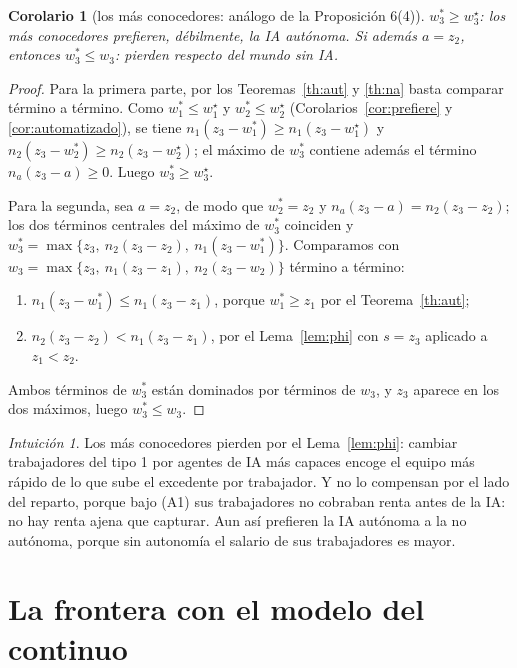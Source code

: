 \documentclass[11pt]{article}
\theoremstyle{plain}
\newtheorem{corolario}{Corolario}
\theoremstyle{definition}
\theoremstyle{remark}
\newtheorem*{intuicion}{Intuición}
\newcommand{\ai}{a}
\begin{document}
\begin{corolario}[los más conocedores: análogo de la Proposición 6(4)]\label{cor:top}
$w_3^{*}\ge w_3^{\star}$: los más conocedores prefieren, débilmente, la IA autónoma. Si además
$\ai=z_2$, entonces $w_3^{*}\le w_3$: pierden respecto del mundo sin IA.
\end{corolario}
\begin{proof}
Para la primera parte, por los Teoremas~\ref{th:aut} y \ref{th:na} basta comparar término a término.
Como $w_1^{*}\le w_1^{\star}$ y $w_2^{*}\le w_2^{\star}$ (Corolarios~\ref{cor:prefiere} y
\ref{cor:automatizado}), se tiene $n_1(z_3-w_1^{*})\ge n_1(z_3-w_1^{\star})$ y
$n_2(z_3-w_2^{*})\ge n_2(z_3-w_2^{\star})$; el máximo de $w_3^{*}$ contiene además el término
$n_a(z_3-\ai)\ge0$. Luego $w_3^{*}\ge w_3^{\star}$.

Para la segunda, sea $\ai=z_2$, de modo que $w_2^{*}=z_2$ y $n_a(z_3-\ai)=n_2(z_3-z_2)$; los dos
términos centrales del máximo de $w_3^{*}$ coinciden y
$w_3^{*}=\max\{z_3,\ n_2(z_3-z_2),\ n_1(z_3-w_1^{*})\}$. Comparamos con
$w_3=\max\{z_3,\ n_1(z_3-z_1),\ n_2(z_3-w_2)\}$ término a término:
\begin{enumerate}[label=(\roman*),leftmargin=2.2em]
  \item $n_1(z_3-w_1^{*})\le n_1(z_3-z_1)$, porque $w_1^{*}\ge z_1$ por el Teorema~\ref{th:aut};
  \item $n_2(z_3-z_2)<n_1(z_3-z_1)$, por el Lema~\ref{lem:phi} con $s=z_3$ aplicado a $z_1<z_2$.
\end{enumerate}
Ambos términos de $w_3^{*}$ están dominados por términos de $w_3$, y $z_3$ aparece en los dos
máximos, luego $w_3^{*}\le w_3$. \qedhere
\end{proof}

\begin{intuicion}
Los más conocedores pierden por el Lema~\ref{lem:phi}: cambiar trabajadores del tipo 1 por agentes de
IA más capaces encoge el equipo más rápido de lo que sube el excedente por trabajador. Y no lo
compensan por el lado del reparto, porque bajo (A1) sus trabajadores no cobraban renta antes de la IA:
no hay renta ajena que capturar. Aun así prefieren la IA autónoma a la no autónoma, porque sin
autonomía el salario de sus trabajadores es mayor.
\end{intuicion}

\section{La frontera con el modelo del continuo}
\end{document}
